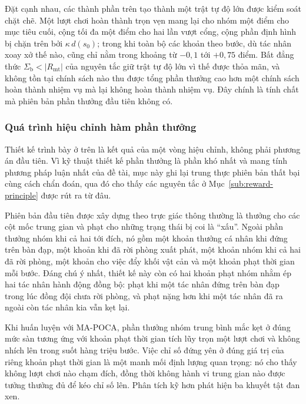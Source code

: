 \indent Đặt cạnh nhau, các thành phần trên tạo thành một trật tự độ lớn được kiểm soát
chặt chẽ. Một lượt chơi hoàn thành trọn vẹn mang lại cho nhóm một điểm cho mục tiêu
cuối, cộng tối đa một điểm cho hai lần vượt cổng, cộng phần định hình bị chặn trên bởi
$\kappa\,d(s_0)$; trong khi toàn bộ các khoản theo bước, dù tác nhân xoay xở thế nào,
cũng chỉ nằm trong khoảng từ $-0{,}1$ tới $+0{,}75$ điểm. Bất đẳng thức
$\Sigma_{\mathrm{b}} < |R_{\mathrm{mt}}|$ của nguyên tắc giữ trật tự độ lớn vì thế được
thỏa mãn, và không tồn tại chính sách nào thu được tổng phần thưởng cao hơn một chính
sách hoàn thành nhiệm vụ mà lại không hoàn thành nhiệm vụ. Đây chính là tính chất mà
phiên bản phần thưởng đầu tiên không có.

\subsubsection{Quá trình hiệu chỉnh hàm phần thưởng}
\label{sub:coop-reward-process}
\indent Thiết kế trình bày ở trên là kết quả của một vòng hiệu chỉnh, không phải phương
án đầu tiên. Vì kỹ thuật thiết kế phần thưởng là phần khó nhất và mang tính phương pháp
luận nhất của đề tài, mục này ghi lại trung thực phiên bản thất bại cùng cách chẩn đoán,
qua đó cho thấy các nguyên tắc ở Mục~\ref{sub:reward-principle} được rút ra từ đâu.

\indent Phiên bản đầu tiên được xây dựng theo trực giác thông thường là thưởng cho các
cột mốc trung gian và phạt cho những trạng thái bị coi là ``xấu''. Ngoài phần thưởng
nhóm khi cả hai tới đích, nó gồm một khoản thưởng cá nhân khi đứng trên bàn đạp, một
khoản khi đã rời phòng xuất phát, một khoản nhóm khi cả hai đã rời phòng, một khoản cho
việc đẩy khối vật cản và một khoản phạt thời gian mỗi bước. Đáng chú ý nhất, thiết kế
này còn có hai khoản phạt nhóm nhằm ép hai tác nhân hành động đồng bộ: phạt khi
một tác nhân đứng trên bàn đạp trong lúc đồng đội chưa rời phòng, và phạt nặng hơn khi
một tác nhân đã ra ngoài còn tác nhân kia vẫn kẹt lại.

\indent Khi huấn luyện với MA-POCA, phần thưởng nhóm trung bình mắc kẹt ở đúng mức sàn
tương ứng với khoản phạt thời gian tích lũy trọn một lượt chơi và không nhích lên trong
suốt hàng triệu bước. Việc chỉ số đứng yên ở đúng giá trị của riêng khoản phạt thời gian
là một manh mối định lượng quan trọng: nó cho thấy không lượt chơi nào chạm đích, đồng
thời không hành vi trung gian nào được tưởng thưởng đủ để kéo chỉ số lên. Phân tích kỹ
hơn phát hiện ba khuyết tật đan xen.


